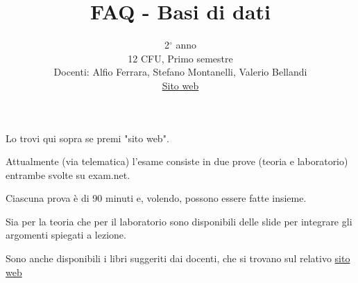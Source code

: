 \documentclass{article}
\title{FAQ - \textbf{Basi di dati}}
\author{
	2$^{\circ}$ anno\\12 CFU, Primo semestre\\
	Docenti: Alfio Ferrara, Stefano Montanelli, Valerio Bellandi\\ 
	\href{https://aferrarabd.ariel.ctu.unimi.it/v5/home/Default.aspx}{Sito web}
	\date{}
}
\begin{document}
 
	\maketitle
	
	\begin{QuestionList}
		
		 {
		    Lo trovi qui sopra se premi "sito web".
		}
		
		
		 {
		    Attualmente (via telematica) l'esame consiste in due prove (teoria e laboratorio) entrambe svolte
		    su exam.net.
		    
		    Ciascuna prova è di 90 minuti e, volendo, possono essere fatte insieme.
		}
		
		 {
		    Sia per la teoria che per il laboratorio sono disponibili delle slide per integrare gli argomenti
		    spiegati a lezione. 
		    
		    Sono anche disponibili i libri suggeriti dai docenti, che si trovano sul relativo \href{https://aferrarabd.ariel.ctu.unimi.it/v5/home/Default.aspx}{sito web}
		}
		
	\end{QuestionList}
	
\end{document}
